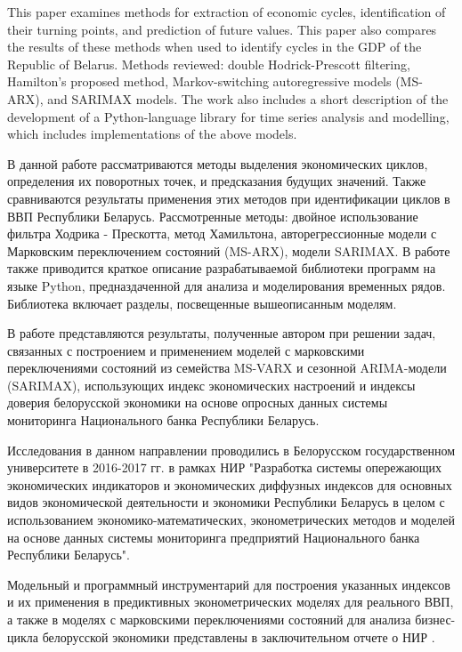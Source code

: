 \documentclass[../main.tex]{subfiles}
\begin{document}
	
	\bsuabstract
	{
		This paper examines methods for extraction of economic cycles, identification of their turning points, and prediction of future values. This paper also compares the results of these methods when used to identify cycles in the GDP of the Republic of Belarus. Methods reviewed: double Hodrick-Prescott filtering, Hamilton's proposed method,  Markov-switching autoregressive models (MS-ARX), and SARIMAX models. The work also includes a short description of the development of a Python-language library for time series analysis and modelling, which includes implementations of the above models.
		
	}{
		В данной работе рассматриваются методы выделения экономических циклов, определения их поворотных точек, и предсказания будущих значений. Также сравниваются результаты применения этих методов при идентификации циклов в ВВП Республики Беларусь. Рассмотренные методы: двойное использование фильтра Ходрика - Прескотта, метод Хамильтона, авторегрессионные модели с Марковским переключением состояний (MS-ARX), модели SARIMAX. В работе также приводится краткое описание разрабатываемой библиотеки программ на языке Python, предназдаченной для анализа и моделирования временных рядов. Библиотека включает разделы, посвещенные вышеописанным моделям.
	}
	
	{
		В работе представляются результаты, полученные автором при решении задач, связанных с построением и применением моделей с марковскими переключениями состояний из семейства MS-VARX и сезонной ARIMA-модели (SARIMAX), использующих индекс экономических настроений и индексы доверия белорусской экономики на основе опросных данных системы мониторинга Национального банка Республики Беларусь.
		
		Исследования в данном направлении проводились в Белорусском государственном университете в 2016-2017 гг. в рамках НИР "Разработка системы опережающих экономических индикаторов и экономических диффузных индексов для основных видов экономической деятельности и экономики Республики Беларусь в целом с использованием экономико-математических, эконометрических методов и моделей на основе данных системы мониторинга предприятий Национального банка Республики Беларусь".
		
		Модельный и программный инструментарий для построения указанных  индексов и их применения в предиктивных эконометрических моделях для реального ВВП, а также в моделях с марковскими переключениями состояний для анализа бизнес-цикла белорусской экономики представлены в заключительном отчете о НИР \cite{esiMaking}.
	}	
\end{document}
